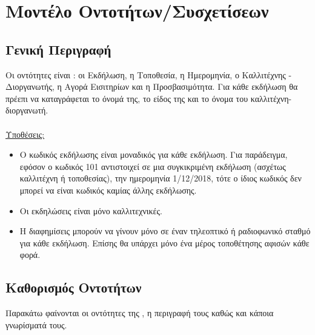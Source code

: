 \section{Μοντέλο Οντοτήτων/Συσχετίσεων}

\subsection{Γενική Περιγραφή}

Οι οντότητες είναι : οι Εκδήλωση, η Τοποθεσία, η Ημερομηνία, ο Καλλιτέχνης - Διοργανωτής, η Αγορά Εισιτηρίων και η Προσβασιμότητα. Για κάθε εκδήλωση θα πρέεπι να καταγράφεται το όνομά της, το είδος της και το όνομα του καλλιτέχνη-διοργανωτή.
\\
\\
\underline{Υποθέσεις:}
\begin{itemize}[noitemsep]

\item Ο κωδικός εκδήλωσης είναι μοναδικός για κάθε εκδήλωση. Για παράδειγμα, εφόσον ο κωδικός 101 αντιστοιχεί σε μια συγκικριμένη εκδήλωση (ασχέτως καλλιτέχνη ή τοποθεσίας), την ημερομηνία 1/12/2018, τότε ο ίδιος κωδικός δεν μπορεί να είναι κωδικός καμίας άλλης εκδήλωσης.
\item Οι εκδηλώσεις είναι μόνο καλλιτεχνικές.
\item Η διαφημίσεις μπορούν να γίνουν μόνο σε έναν τηλεοπτικό ή ραδιοφωνικό σταθμό για κάθε εκδήλωση. Επίσης θα υπάρχει μόνο ένα μέρος τοποθέτησης αφισών κάθε φορά.


\end{itemize}

\subsection{Καθορισμός Οντοτήτων}

Παρακάτω φαίνονται οι οντότητες της \titlos, η περιγραφή τους καθώς και κάποια γνωρίσματά τους.

